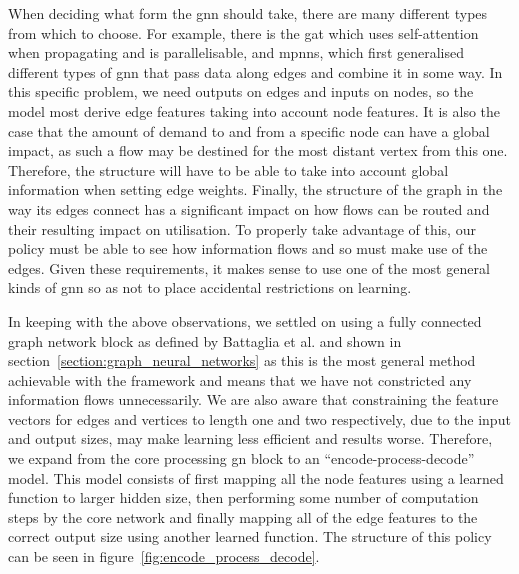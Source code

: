 When deciding what form the \ac{gnn} should take, there are many different types from which to choose. For example, there is the \ac{gat}\cite{velivckovic2017graph} which uses self-attention when propagating and is parallelisable, and \acp{mpnn}\cite{gilmer2017neural}, which first generalised different types of \ac{gnn} that pass data along edges and combine it in some way. In this specific problem, we need outputs on edges and inputs on nodes, so the model most derive edge features taking into account node features. It is also the case that the amount of demand to and from a specific node can have a global impact, as such a flow may be destined for the most distant vertex from this one. Therefore, the structure will have to be able to take into account global information when setting edge weights. Finally, the structure of the graph in the way its edges connect has a significant impact on how flows can be routed and their resulting impact on utilisation. To properly take advantage of this, our policy must be able to see how information flows and so must make use of the edges. Given these requirements, it makes sense to use one of the most general kinds of \ac{gnn} so as not to place accidental restrictions on learning.

In keeping with the above observations, we settled on using a fully connected graph network block as defined by Battaglia et al.\cite{battaglia2018relational} and shown in section~\ref{section:graph_neural_networks} as this is the most general method achievable with the framework and means that we have not constricted any information flows unnecessarily. We are also aware that constraining the feature vectors for edges and vertices to length one and two respectively, due to the input and output sizes, may make learning less efficient and results worse. Therefore, we expand from the core processing \ac{gn} block to an \enquote{encode-process-decode} model. This model consists of first mapping all the node features using a learned function to larger hidden size, then performing some number of computation steps by the core network and finally mapping all of the edge features to the correct output size using another learned function. The structure of this policy can be seen in figure~\ref{fig:encode_process_decode}.

